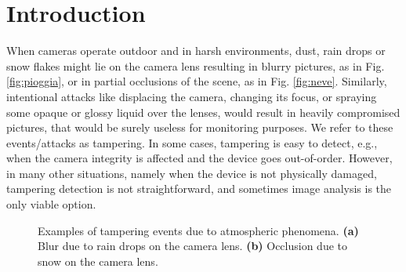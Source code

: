 \documentclass{llncs}
\newcommand{\gi}[1]{{\textcolor{red}{[\small \textbf{Giacomo}: #1]}}}
\begin{document}
\section{Introduction}\label{sec:introduction}


When cameras operate outdoor and in harsh environments, dust, rain drops or snow flakes might lie on the camera lens resulting in blurry pictures, as in Fig. \ref{fig:pioggia}, or in partial occlusions of the scene, as in Fig. \ref{fig:neve}. Similarly, intentional attacks like displacing the camera, changing its focus, or spraying some opaque or glossy liquid over the lenses, would result in heavily compromised pictures, that would be surely useless for monitoring purposes. We refer to these events/attacks as tampering. In some cases, tampering is easy to detect, e.g., when the camera integrity is affected and the device goes out-of-order. However, in many other situations, namely when the device is not physically damaged, tampering detection is not straightforward, and sometimes image analysis is the only viable option. 

\begin{figure}[t!]
\centering
{}
\caption[Tampering examples]{Examples of tampering events due to atmospheric phenomena. \textbf{(a)} Blur due to rain drops on the camera lens. \textbf{(b)} Occlusion due to snow on the camera lens.}
\label{fig:tampering}
\end{figure}
\end{document}
